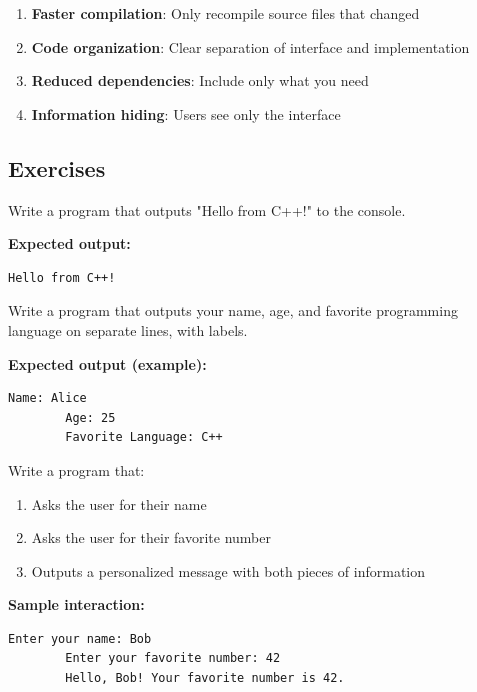 \begin{enumerate}
	\item \textbf{Faster compilation}: Only recompile source files that changed
	\item \textbf{Code organization}: Clear separation of interface and implementation
	\item \textbf{Reduced dependencies}: Include only what you need
	\item \textbf{Information hiding}: Users see only the interface
\end{enumerate}

\subsection{Exercises}

\begin{example}{\leavevmode}
	
	Write a program that outputs "Hello from C++!" to the console.
	
	\textbf{Expected output:}
	\begin{lstlisting}[numbers=none]
		Hello from C++!
	\end{lstlisting}
\end{example}

\begin{example}{\leavevmode}
	
	Write a program that outputs your name, age, and favorite programming language on separate lines, with labels.
	
	\textbf{Expected output (example):}
	\begin{lstlisting}[numbers=none]
		Name: Alice
		Age: 25
		Favorite Language: C++
	\end{lstlisting}
\end{example}

\begin{example}{\leavevmode}
	
	Write a program that:
	\begin{enumerate}
		\item Asks the user for their name
		\item Asks the user for their favorite number
		\item Outputs a personalized message with both pieces of information
	\end{enumerate}
	
	\textbf{Sample interaction:}
	\begin{lstlisting}[numbers=none]
		Enter your name: Bob
		Enter your favorite number: 42
		Hello, Bob! Your favorite number is 42.
	\end{lstlisting}
\end{example}